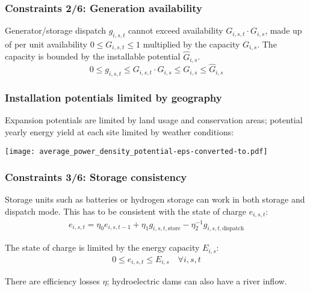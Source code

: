 \documentclass[10pt,aspectratio=169,dvipsnames]{beamer}
\begin{document}
\begin{frame}
  \frametitle{Constraints 2/6: Generation availability}
  Generator/storage dispatch $g_{i,s,t}$ cannot exceed availability $G_{i,s,t}\cdot G_{i,s}$, made up of per unit availability $0 \leq G_{i,s,t} \leq 1$ multiplied by the capacity $G_{i,s}$. The capacity is bounded by the installable potential $\hat{G}_{i,s}$.
    \begin{equation*}
      0 \leq g_{i,s,t} \leq G_{i,s,t}\cdot G_{i,s} \leq  G_{i,s} \leq  \hat{G}_{i,s}
    \end{equation*}

    \centering

\end{frame}




\begin{frame}
  \frametitle{Installation potentials limited by geography}

  Expansion potentials are limited by \alert{land usage} and
  \alert{conservation areas}; potential yearly energy yield at each site
  limited by \alert{weather conditions}:

  \centering
  \texttt{[image: average\_power\_density\_potential-eps-converted-to.pdf]}
\end{frame}




\begin{frame}
  \frametitle{Constraints 3/6: Storage consistency}

  Storage units such as batteries or hydrogen storage can work in both
  storage and dispatch mode. This has to be consistent with the state
  of charge $e_{i,s,t}$:
  \begin{align*}
    e_{i,s,t} = \eta_0e_{i,s,t-1} + \eta_1g_{i,s,t,\textrm{store}} -  \eta_2^{-1} g_{i,s,t,\textrm{dispatch}}
  \end{align*}

  The state of charge is limited by the energy capacity $E_{i,s}$:
  \begin{align*}
    0 \leq e_{i,s,t} \leq E_{i,s} \quad \forall i,s,t
  \end{align*}


  There are efficiency losses $\eta$; hydroelectric dams can also have a river inflow.

\end{frame}
\end{document}
